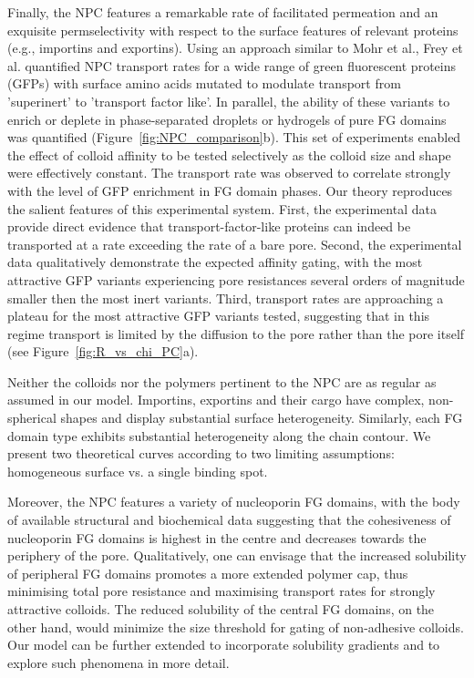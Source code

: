 \documentclass[12pt, a4paper]{article}
\begin{document}
Finally, the NPC features a remarkable rate of facilitated permeation and an exquisite permselectivity with respect to the surface features of relevant proteins (e.g., importins and exportins).
Using an approach similar to Mohr et al., Frey et al. quantified NPC transport rates for a wide range of green fluorescent proteins (GFPs) with surface amino acids mutated to modulate transport from 'superinert' to 'transport factor like'.
In parallel, the ability of these variants to enrich or deplete in phase-separated droplets or hydrogels of pure FG domains was quantified (Figure~\ref{fig:NPC_comparison}b).
This set of experiments enabled the effect of colloid affinity to be tested selectively as the colloid size and shape were effectively constant.
The transport rate was observed to correlate strongly with the level of GFP enrichment in FG domain phases.
Our theory reproduces the salient features of this experimental system.
First, the experimental data provide direct evidence that transport-factor-like proteins can indeed be transported at a rate exceeding the rate of a bare pore.
Second, the experimental data qualitatively demonstrate the expected affinity gating, with the most attractive GFP variants experiencing pore resistances several orders of magnitude smaller then the most inert variants.
Third, transport rates are approaching a plateau for the most attractive GFP variants tested, suggesting that in this regime transport is limited by the diffusion to the pore rather than the pore itself (see Figure~\ref{fig:R_vs_chi_PC}a).

Neither the colloids nor the polymers pertinent to the NPC are as regular as assumed in our model.
Importins, exportins and their cargo have complex, non-spherical shapes and display substantial surface heterogeneity.
Similarly, each FG domain type exhibits substantial heterogeneity along the chain contour.
We present two theoretical curves according to two limiting assumptions: homogeneous surface vs. a single binding spot.

Moreover, the NPC features a variety of nucleoporin FG domains, with the body of available structural and biochemical data suggesting that the cohesiveness of nucleoporin FG domains is highest in the centre and decreases towards the periphery of the pore.
Qualitatively, one can envisage that the increased solubility of peripheral FG domains promotes a more extended polymer cap, thus minimising total pore resistance and maximising transport rates for strongly attractive colloids.
The reduced solubility of the central FG domains, on the other hand, would minimize the size threshold for gating of non-adhesive colloids.
Our model can be further extended to incorporate  solubility gradients and to explore such phenomena in more detail.
\end{document}
